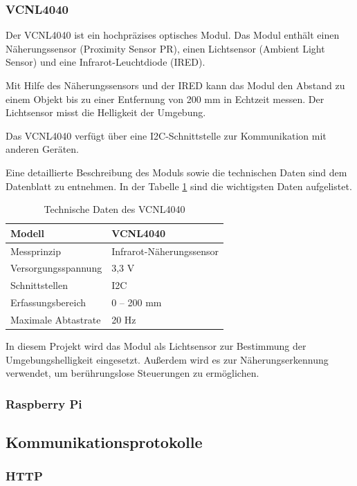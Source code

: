 \documentclass[12pt, letterpaper]{article}
\begin{document}
  \subsubsection{VCNL4040}
  \par Der VCNL4040 ist ein hochpräzises optisches Modul. Das Modul enthält einen Näherungssensor (Proximity Sensor PR), einen Lichtsensor (Ambient Light Sensor) und eine Infrarot-Leuchtdiode (IRED). 
  \par Mit Hilfe des Näherungssensors und der IRED kann das Modul den Abstand zu einem Objekt bis zu einer Entfernung von 200 mm in Echtzeit messen. Der Lichtsensor misst die Helligkeit der Umgebung. 
  \par Das VCNL4040 verfügt über eine I2C-Schnittstelle zur Kommunikation mit anderen Geräten. 
  \par Eine detaillierte Beschreibung des Moduls sowie die technischen Daten sind dem Datenblatt \cite{vcnl4040} zu entnehmen. In der Tabelle \ref{tab:vcnl4040td} sind die wichtigsten Daten aufgelistet.
  \begin{table}[h]
    \centering
    \begin{tabular}{|l|l|}
    \hline
    Modell & VCNL4040 \\ \hline
    Messprinzip & Infrarot-Näherungssensor \\ \hline
    Versorgungsspannung & 3,3 V \\ \hline
    Schnittstellen & I2C \\ \hline
    Erfassungsbereich & 0 – 200 mm \\
    Maximale Abtastrate & 20 Hz \\ \hline
    \end{tabular}
    \caption{Technische Daten des VCNL4040}
    \label{tab:vcnl4040td}
    \end{table}

  \par In diesem Projekt wird das Modul als Lichtsensor zur Bestimmung der Umgebungshelligkeit eingesetzt. Außerdem wird es zur Näherungserkennung verwendet, um berührungslose Steuerungen zu ermöglichen.
  \subsubsection{Raspberry Pi}
  \subsection{Kommunikationsprotokolle}
  \subsubsection{HTTP}
\end{document}
